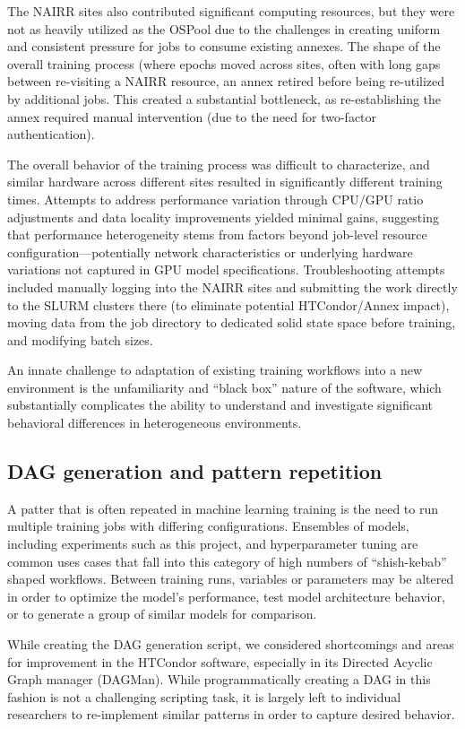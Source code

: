 \documentclass{article}
\begin{document}
The NAIRR sites also contributed significant computing resources, but they were
not as heavily utilized as the OSPool due to the challenges in creating uniform
and consistent pressure for jobs to consume existing annexes. The shape of the
overall training process (where epochs moved across sites, often with long gaps
between re-visiting a NAIRR resource, an annex retired before being re-utilized
by additional jobs. This created a substantial bottleneck, as re-establishing
the annex required manual intervention (due to the need for two-factor
authentication).

The overall behavior of the training process was difficult to characterize, and
similar hardware across different sites resulted in significantly different
training times. Attempts to address performance variation through CPU/GPU ratio
adjustments and data locality improvements yielded minimal gains, suggesting
that performance heterogeneity stems from factors beyond job-level resource
configuration—potentially network characteristics or underlying hardware
variations not captured in GPU model specifications. Troubleshooting attempts
included manually logging into the NAIRR sites and submitting the work directly
to the SLURM clusters there (to eliminate potential HTCondor/Annex impact),
moving data from the job directory to dedicated solid state space before
training, and modifying batch sizes.

An innate challenge to adaptation of existing training workflows into a new
environment is the unfamiliarity and ``black box'' nature of the software, which
substantially complicates the ability to understand and investigate significant
behavioral differences in heterogeneous environments.

\subsection{DAG generation and pattern repetition}
A patter that is often repeated in machine learning training is the need to run
multiple training jobs with differing configurations. Ensembles of models,
including experiments such as this project, and hyperparameter tuning are common
uses cases that fall into this category of high numbers of ``shish-kebab''
shaped workflows. Between training runs, variables or parameters may be altered
in order to optimize the model's performance, test model architecture behavior,
or to generate a group of similar models for comparison.

While creating the DAG generation script, we considered shortcomings and areas
for improvement in the HTCondor software, especially in its Directed Acyclic
Graph manager (DAGMan). While programmatically creating a DAG in this fashion is
not a challenging scripting task, it is largely left to individual researchers
to re-implement similar patterns in order to capture desired behavior.
\end{document}
